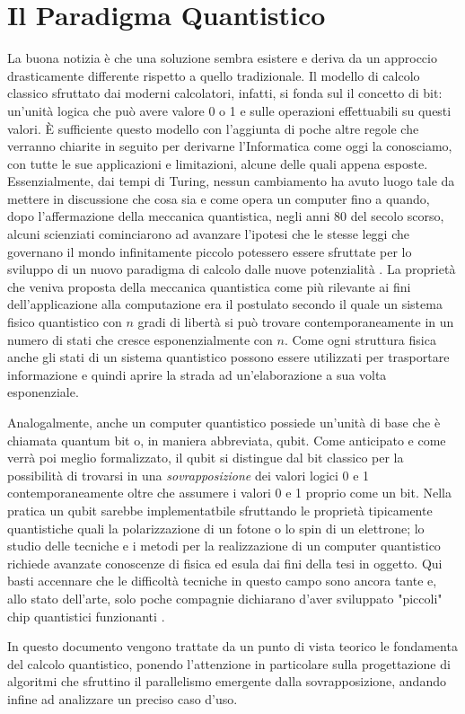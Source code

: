 \documentclass[12pt,a4paper,openright]{report}
\begin{document}
\section{Il Paradigma Quantistico}
La buona notizia è che una soluzione sembra esistere e deriva da un approccio drasticamente differente rispetto a quello tradizionale. Il modello di calcolo classico sfruttato dai moderni calcolatori, infatti,
si fonda sul il concetto di bit: un'unità logica che può avere valore 0 o 1 e sulle operazioni effettuabili su questi valori. È sufficiente questo modello con l'aggiunta di poche altre regole che verranno
chiarite in seguito per derivarne l'Informatica come oggi la conosciamo, con tutte le sue applicazioni e limitazioni, alcune delle quali appena esposte. Essenzialmente, dai tempi di Turing, nessun cambiamento
ha avuto luogo tale da mettere in discussione che cosa sia e come opera un computer fino a quando, dopo l'affermazione della meccanica quantistica, negli anni 80 del secolo scorso, alcuni scienziati
cominciarono ad avanzare l'ipotesi che le stesse leggi che governano il mondo infinitamente piccolo potessero essere sfruttate per lo sviluppo di un nuovo paradigma di calcolo dalle nuove potenzialità \cite{ref6}.
La proprietà che veniva proposta della meccanica quantistica come più rilevante ai fini dell'applicazione alla computazione era il postulato secondo il quale un sistema fisico quantistico con $n$ gradi di libertà
si può trovare contemporaneamente in un numero di stati che cresce esponenzialmente con $n$. Come ogni struttura fisica anche gli stati di un sistema quantistico possono essere utilizzati per trasportare
informazione e quindi aprire la strada ad un'elaborazione a sua volta esponenziale. 
\par Analogalmente, anche un computer quantistico possiede un'unità di base che è chiamata quantum bit o, in maniera abbreviata, qubit. Come anticipato e come verrà poi meglio formalizzato, il qubit si distingue dal bit classico
per la possibilità di trovarsi in una \emph{sovrapposizione} dei valori logici 0 e 1 contemporaneamente oltre che assumere i valori 0 e 1 proprio come un bit. Nella pratica un qubit sarebbe implementatbile 
sfruttando le proprietà tipicamente quantistiche quali la polarizzazione di un fotone o lo spin di un elettrone; lo studio delle tecniche e i metodi per la realizzazione di un computer quantistico richiede
avanzate conoscenze di fisica ed esula dai fini della tesi in oggetto. Qui basti accennare che le difficoltà tecniche in questo campo sono ancora tante e, allo stato dell'arte, solo poche compagnie dichiarano
d'aver sviluppato "piccoli" chip quantistici funzionanti \cite{ref24}.\par
In questo documento vengono trattate da un punto di vista teorico le fondamenta del calcolo quantistico, ponendo l'attenzione in particolare sulla progettazione di algoritmi che sfruttino il parallelismo 
emergente dalla sovrapposizione, andando infine ad analizzare un preciso caso d'uso.  
\end{document}
